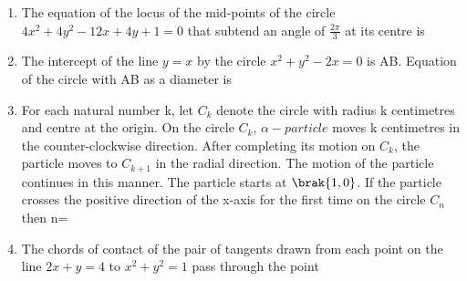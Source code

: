 \begin{enumerate}
	\hfill{}
\item The equation of the locus of the mid-points of the circle $4x^{2}+4y^{2}-12x+4y+1=0$ that subtend an angle of $\frac{2\pi}{3}$ at its centre is

	\hfill{}
\item The intercept of the line $y=x$ by the circle $x^{2}+y^{2}-2x=0$ is AB. Equation of the circle with AB as a diameter is

	\hfill{}
\item For each natural number k, let $C_k$ denote the circle with radius k centimetres and centre at the origin. On the circle $C_k$, $\alpha-particle$ moves k centimetres in the counter-clockwise direction. After completing its motion on $C_k$, the particle moves to $C_{k+1}$ in the radial direction. The motion of the particle continues in this manner. The particle starts at $\brak{1,0}$. If the particle crosses the positive direction of the x-axis for the first time on the circle $C_n$ \\then n=

	\hfill{}
\item The chords of contact of the pair of tangents drawn from each point on the line $2x+y=4$ to $x^{2}+y^{2}=1$ pass through the point


\end{enumerate}
